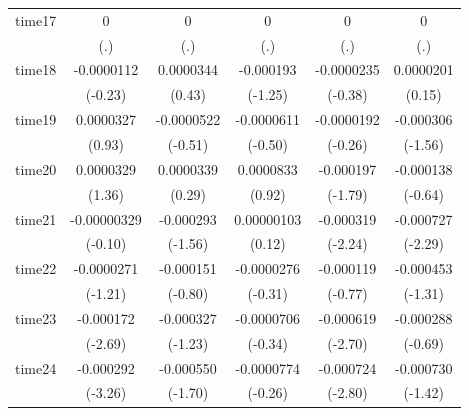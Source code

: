 \begin{table}[htbp]
\begin{tabular}{l*{5}{c}}
time17      &           0         &           0         &           0         &           0         &           0         \\
            &         (.)         &         (.)         &         (.)         &         (.)         &         (.)         \\
time18      &  -0.0000112         &   0.0000344         &   -0.000193         &  -0.0000235         &   0.0000201         \\
            &     (-0.23)         &      (0.43)         &     (-1.25)         &     (-0.38)         &      (0.15)         \\
time19      &   0.0000327         &  -0.0000522         &  -0.0000611         &  -0.0000192         &   -0.000306         \\
            &      (0.93)         &     (-0.51)         &     (-0.50)         &     (-0.26)         &     (-1.56)         \\
time20      &   0.0000329         &   0.0000339         &   0.0000833         &   -0.000197         &   -0.000138         \\
            &      (1.36)         &      (0.29)         &      (0.92)         &     (-1.79)         &     (-0.64)         \\
time21      & -0.00000329         &   -0.000293         &  0.00000103         &   -0.000319\sym{*}  &   -0.000727\sym{*}  \\
            &     (-0.10)         &     (-1.56)         &      (0.12)         &     (-2.24)         &     (-2.29)         \\
time22      &  -0.0000271         &   -0.000151         &  -0.0000276         &   -0.000119         &   -0.000453         \\
            &     (-1.21)         &     (-0.80)         &     (-0.31)         &     (-0.77)         &     (-1.31)         \\
time23      &   -0.000172\sym{**} &   -0.000327         &  -0.0000706         &   -0.000619\sym{**} &   -0.000288         \\
            &     (-2.69)         &     (-1.23)         &     (-0.34)         &     (-2.70)         &     (-0.69)         \\
time24      &   -0.000292\sym{**} &   -0.000550         &  -0.0000774         &   -0.000724\sym{**} &   -0.000730         \\
            &     (-3.26)         &     (-1.70)         &     (-0.26)         &     (-2.80)         &     (-1.42)         \\

\end{tabular}
\end{table}
